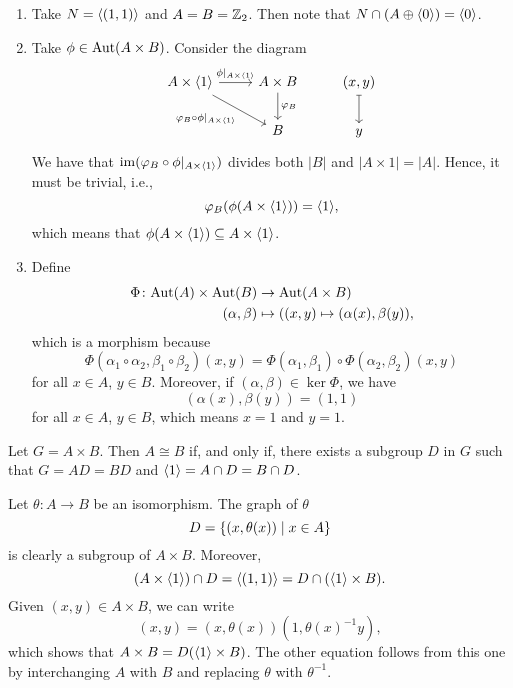 \begin{solution}
\begin{solution}
\begin{enumerate}[\rm a)]
    \item Take $N=\langle(1,1)\rangle$ and $A=B=\mathbb{Z}_2$. Then note that $N\cap (A\oplus\langle0\rangle)=\langle0\rangle$.

    \item Take $\phi\in{\rm Aut}(A\times B)$. Consider the diagram
    $$
        \begin{tikzcd}
            A\times\gen1\arrow[r,"\phi|_{A\times\gen1}"]
                    \arrow[rd,"\varphi_B\circ\phi|_{A\times\gen1}"']
                &A\times B\arrow[d,"\varphi_B"]
                &(x,y)\arrow[d,mapsto]\\
                &B
                &y
        \end{tikzcd}
    $$
    We have that $\operatorname{im}(\varphi_B\circ\phi|_{A\times\langle1\rangle})$ divides both $|B|$ and $|A\times1|=|A|$. Hence, it must be trivial, i.e.,
    $$
        \varphi_B(\phi(A\times\langle1\rangle))=\langle1\rangle,
    $$
    which means that $\phi(A\times\langle1\rangle)\subseteq A\times\langle1\rangle$.

    \item Define
    \begin{align*}
        \Phi\colon{\rm Aut}(A)\times{\rm Aut}(B)&\to{\rm Aut}(A\times B)\\
        (\alpha,\beta)&\mapsto((x,y)\mapsto(\alpha(x),\beta(y)),
    \end{align*}
    which is a morphism because
    $$
        \Phi(\alpha_1\circ\alpha_2,\beta_1\circ\beta_2)(x,y)
            = \Phi(\alpha_1,\beta_1)\circ\Phi(\alpha_2,\beta_2)(x,y)
    $$
    for all $x\in A$, $y\in B$. Moreover, if $(\alpha,\beta)\in\ker\Phi$, we have
    $$
        (\alpha(x),\beta(y))=(1,1)
    $$
    for all $x\in A$, $y\in B$, which means $x=1$ and $y=1$.
\end{enumerate}
\end{solution}

\begin{exr}\label{exercise-1.6.2}
    Let\/ $G=A\times B$. Then\/ $A\cong B$ if, and only if, there exists a subgroup\/ $D$ in\/ $G$ such that\/ $G=AD=BD$ and\/ $\langle1\rangle=A\cap D=B\cap D$.
\end{exr}

\begin{solution}
Let $\theta\colon A\to B$ be an isomorphism. The graph of $\theta$
$$
    D = \{(x,\theta(x))\mid x\in A\}
$$
is clearly a subgroup of $A\times B$. Moreover,
$$
    (A\times\langle1\rangle)\cap D=\langle(1,1)\rangle=D\cap(\langle1\rangle\times B).
$$
Given $(x,y)\in A\times B$, we can write
$$
    (x,y) = (x,\theta(x))(1,\theta(x)^{-1}y),
$$
which shows that $A\times B=D(\langle1\rangle\times B)$. The other equation follows from this one by interchanging $A$ with $B$ and replacing $\theta$ with $\theta^{-1}$.


\end{solution}
\end{solution}
